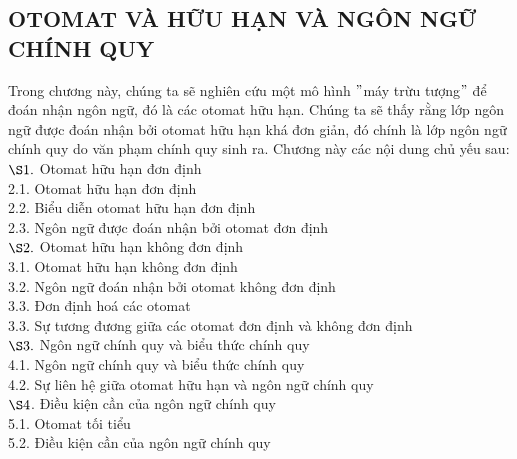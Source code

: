 \setcounter{chapter}{1}
\begin{flushright}
\chapter{\textbf{OTOMAT VÀ HỮU HẠN VÀ NGÔN NGỮ CHÍNH QUY}}
\end{flushright}
\begin{flushleft}
\hspace{10mm}Trong chương này, chúng ta sẽ nghiên cứu một mô hình $"$máy trừu tượng$"$ để đoán nhận ngôn ngữ, đó là các otomat hữu hạn. Chúng ta sẽ thấy rằng lớp ngôn ngữ được đoán nhận bởi otomat hữu hạn khá đơn giản, đó chính là lớp ngôn ngữ chính quy do văn phạm chính quy sinh ra. Chương này các nội dung chủ yếu sau:\\ 
$\S1.$ Otomat hữu hạn đơn định\\
\hspace{10mm}2.1. Otomat hữu hạn đơn định\\
\hspace{10mm}2.2. Biểu diễn otomat hữu hạn đơn định\\
\hspace{10mm}2.3. Ngôn ngữ được đoán nhận bởi otomat đơn định\\
$\S2.$ Otomat hữu hạn không đơn định\\
\hspace{10mm}3.1. Otomat hữu hạn không đơn định\\
\hspace{10mm}3.2. Ngôn ngữ đoán nhận bởi otomat không đơn định\\
\hspace{10mm}3.3. Đơn định hoá các otomat\\
\hspace{10mm}3.3. Sự tương đương giữa các otomat đơn định và không đơn định\\
$\S3.$ Ngôn ngữ chính quy và biểu thức chính quy\\
\hspace{10mm}4.1. Ngôn ngữ chính quy và biểu thức chính quy\\
\hspace{10mm}4.2. Sự liên hệ giữa otomat hữu hạn và ngôn ngữ chính quy\\
$\S4$. Điều kiện cần của ngôn ngữ chính quy\\
\hspace{10mm}5.1. Otomat tối tiểu\\
\hspace{10mm}5.2. Điều kiện cần của ngôn ngữ chính quy\\

\end{flushleft}

